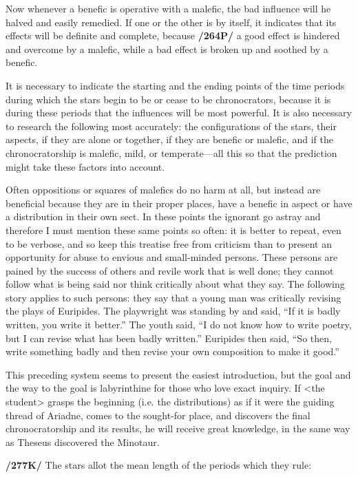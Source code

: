 Now whenever a benefic is operative with a malefic, the bad influence will he halved and easily remedied. If one or the other is by itself, it indicates that its effects will be definite and complete, because \textbf{/264P/} a good effect is hindered and overcome by a malefic, while a bad effect is broken up and soothed by a benefic.

It is necessary to indicate the starting and the ending points of the time periods during which the stars begin to be or cease to be chronocrators, because it is during these periods that the influences will be most
powerful. It is also necessary to research the following most accurately: the configurations of the stars, their aspects, if they are alone or together, if they are benefic or malefic, and if the chronocratorship is malefic, mild, or temperate—all this so that the prediction might take these factors into account. 

Often \mnmb oppositions or squares of malefics do no harm at all, but instead are beneficial because they are in their proper places, have a benefic in aspect or have a distribution in their own sect. In these points the ignorant go astray and therefore I must mention these same points so often: it is better to repeat, even to be verbose, and so keep this treatise free from criticism than to present an opportunity for abuse to envious and small-minded persons. These persons are pained by the success of others and revile work that is well done; they cannot follow what is being said nor think critically about what they say. The following story applies to such persons: they say that a young man was critically
revising the plays of Euripides. The playwright was standing by and said, “If it is badly written, you write it better.” The youth said, “I do not know how to write poetry, but I can revise what has been badly
written.” Euripides then said, “So then, write something badly and then revise your own composition to make it good.” 

This preceding system seems to present the easiest introduction, but the goal and the way to the goal is labyrinthine for those who love exact inquiry. If <the student> grasps the beginning (i.e. the
distributions) as if it were the guiding thread of Ariadne, comes to the sought-for place, and discovers the final chronocratorship and its results, he will receive great knowledge, in the same way as Theseus
discovered the Minotaur.

\textbf{/277K/} The stars allot the mean length of the periods which they rule: 

